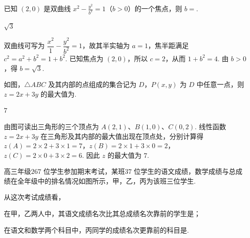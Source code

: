 \begin{problem}
已知 \((2,0)\) 是双曲线 \(x^{2} - \frac{y^{2}}{b^{2}} = 1\)（\(b > 0\)）的一个焦点，则 \(b =\)\fillinblank{}.
\end{problem}

\begin{answer}
\(\sqrt{3}\)
\end{answer}

\begin{solution}
双曲线可写为 \(\dfrac{x^2}{1}-\dfrac{y^2}{b^2}=1\)，故其半实轴为 \(a=1\)，焦半距满足 \(c^2=a^2+b^2=1+b^2\). 已知焦点为 \((2,0)\)，所以 \(c=2\)，从而 \(1+b^2=4\). 由 \(b>0\)，得 \(b=\sqrt3\).
\end{solution}

\begin{problem}
如图，\(\triangle ABC\) 及其内部的点组成的集合记为 \(D\)，\(P(x, y)\) 为 \(D\) 中任意一点，则 \(z = 2x + 3y\) 的最大值为\fillinblank{}.

\end{problem}

\begin{answer}
\(7\)
\end{answer}

\begin{solution}
由图可读出三角形的三个顶点为 \(A(2,1)\)、\(B(1,0)\)、\(C(0,2)\). 线性函数 \(z=2x+3y\) 在三角形及其内部的最大值出现在顶点处，分别计算得
\(z(A)=2\times2+3\times1=7\)，\(z(B)=2\times1+3\times0=2\)，\(z(C)=2\times0+3\times2=6\). 因此 \(z\) 的最大值为 \(7\).
\end{solution}

\begin{problem}
高三年级\(267\text{ 位}\)学生参加期末考试，某班\(37\text{ 位}\)学生的语文成绩，数学成绩与总成绩在全年级中的排名情况如图所示，甲，乙，丙为该班三位学生.

从这次考试成绩看，

\begin{circlelist}
\item 在甲，乙两人中，其语文成绩名次比其总成绩名次靠前的学生是\fillinblank{}；
\item 在语文和数学两个科目中，丙同学的成绩名次更靠前的科目是\fillinblank{}.
\end{circlelist}

\end{problem}

